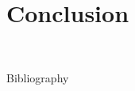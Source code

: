 \documentclass[A4,svgnames,9pt,aspectratio=169]{beamer}
\begin{document}
\section{Conclusion}


\
\begin{frame}[allowframebreaks]{Bibliography}
\printbibliography[]
\nocite{*}
\end{frame}







\renewcommand{\thankyou}{Thank You.}
\frame{\merci}

\end{document}
